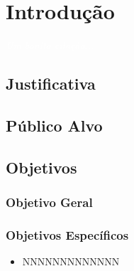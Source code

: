 \documentclass[11pt,fleqn]{book} %
\begin{document}
\chapter{Introdução}\label{introducao}
\vspace{6em}
\begin{flushright}
	\textit{\textcolor{white}{Um bonita citação...}}
\end{flushright}
\vspace{12em}


\section{Justificativa}


\section{Público Alvo}


\section{Objetivos}\label{objetivos}

\subsection{Objetivo Geral}


\subsection{Objetivos Específicos}

\begin{itemize}
\item NNNNNNNNNNNNN 
\end{itemize}
\end{document}
